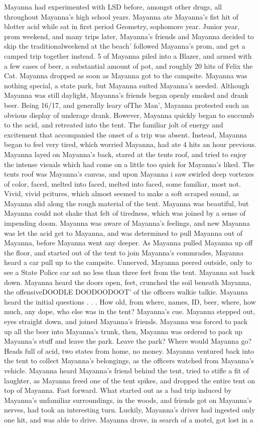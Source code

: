 \documentclass[12pt]{book}
\begin{document}
Mayanna had experimented with LSD before, amongst other drugs, all throughout Mayanna's high school years. Mayanna ate Mayanna's fist hit of blotter acid while sat in first period Geometry, sophomore year. Junior year, prom weekend, and many trips later, Mayanna's friends and Mayanna decided to skip the traditionalweekend at the beach' followed Mayanna's prom, and get a camped trip together instead. 5 of Mayanna piled into a Blazer, and armed with a few cases of beer, a substantial amount of pot, and roughly 20 hits of Felix the Cat. Mayanna dropped as soon as Mayanna got to the campsite. Mayanna was nothing special, a state park, but Mayanna suited Mayanna's needed. Although Mayanna was still daylight, Mayanna's friends began openly smoked and drank beer. Being 16/17, and generally leary ofThe Man', Mayanna protested such an obvious display of underage drank. However, Mayanna quickly began to succumb to the acid, and retreated into the tent. The familiar jolt of energy and excitement that accompanied the onset of a trip was absent. Instead, Mayanna began to feel very tired, which worried Mayanna, had ate 4 hits an hour previous. Mayanna layed on Mayanna's back, stared at the tents roof, and tried to enjoy the intense visuals which had come on a little too quick for Mayanna's liked. The tents roof was Mayanna's canvas, and upon Mayanna i saw swirled deep vortexes of color, faced, melted into faced, melted into faced, some familiar, most not. Vivid, vivid pcitures, which almost seemed to make a soft scraped sound, as Mayanna slid along the rough material of the tent. Mayanna was beautiful, but Mayanna could not shake that felt of tiredness, which was joined by a sense of impending doom. Mayanna was aware of Mayanna's feelings, and new Mayanna was let the acid get to Mayanna, and was determined to pull Mayanna out of Mayanna, before Mayanna went any deeper. As Mayanna pulled Mayanna up off the floor, and started out of the tent to join Mayanna's commrades, Mayanna heard a car pull up to the campsite. Unnerved, Mayanna peered outside, only to see a State Police car sat no less than three feet from the tent. Mayanna sat back down. Mayanna heard the doors open, feet, crunched the soil beneath Mayanna, the offensiveDOODLE DOODOODOOT' of the officers walkie talkie. Mayanna heard the initial questions . . .  How old, from where, names, ID, beer, where, how much, any dope, who else was in the tent? Mayanna's cue. Mayanna stepped out, eyes straight down, and joined Mayanna's friends. Mayanna was forced to pack up all the beer into Mayanna's trunk, then, Mayanna was ordered to pack up Mayanna's stuff and leave the park. Leave the park? Where would Mayanna go? Heads full of acid, two states from home, no money. Mayanna ventured back into the tent to collect Mayanna's belongings, as the officers watched from Mayanna's vehicle. Mayanna heard Mayanna's friend behind the tent, tried to stifle a fit of laughter, as Mayanna freed one of the tent spikes, and dropped the entire tent on top of Mayanna. Fast forward. What started out as a bad trip induced by Mayanna's unfamiliar surroundings, in the woods, and friends got on Mayanna's nerves, had took an interesting turn. Luckily, Mayanna's driver had ingested only one hit, and was able to drive. Mayanna drove, in search of a motel, got lost in a 
\end{document}
